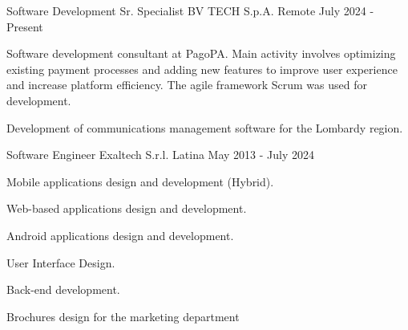 

\begin{cventries}

  \cventry
    {Software Development Sr. Specialist} %
    {BV TECH S.p.A.} %
    {Remote} %
    {July 2024 - Present} %
    {
      \begin{cvitems} %
        \item {Software development consultant at PagoPA. Main activity involves optimizing existing payment processes and adding new features to improve user experience and increase platform efficiency. The agile framework Scrum was used for development.}
        \item {Development of communications management software for the Lombardy region.}  
      \end{cvitems}
    }

  \cventry
    {Software Engineer} %
    {Exaltech S.r.l.} %
    {Latina} %
    {May 2013 - July 2024} %
    {
      \begin{cvitems} %
        \item {Mobile applications design and development (Hybrid).}
        \item {Web-based applications design and development.}  
        \item {Android applications design and development.}  
        \item {User Interface Design.}  
        \item {Back-end development.}  
        \item {Brochures design for the marketing department}  
      \end{cvitems}
    }


\end{cventries}

